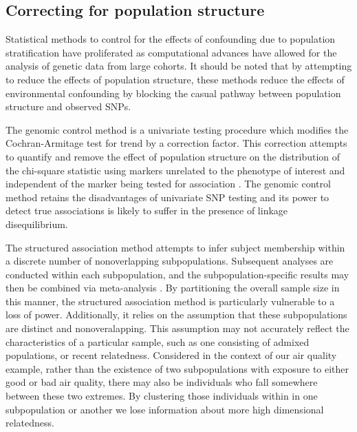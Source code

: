 


\subsection{Correcting for population structure}

Statistical methods to control for the effects of confounding due to population stratification have proliferated as computational advances have allowed for the analysis of genetic data from large cohorts. It should be noted that by attempting to reduce the effects of population structure, these methods reduce the effects of environmental confounding by blocking the casual pathway between population structure and observed SNPs.

The genomic control method is a univariate testing procedure which modifies the Cochran-Armitage test for trend by a correction factor. This correction attempts to quantify and remove the effect of population structure on the distribution of the chi-square statistic using markers unrelated to the phenotype of interest and independent of the marker being tested for association \cite{devlin1999genomic, bacanu2000power, wang2009testing}. The genomic control method retains the disadvantages of univariate SNP testing and its power to detect true associations is likely to suffer in the presence of linkage disequilibrium. 

The structured association method attempts to infer subject membership within a discrete number of nonoverlapping subpopulations. Subsequent analyses are conducted within each subpopulation, and the subpopulation-specific results may then be combined via meta-analysis \cite{pritchard1999use, pritchard2000association}. By partitioning the overall sample size in this manner, the structured association method is particularly vulnerable to a loss of power. Additionally, it relies on the assumption that these subpopulations are distinct and nonoveralapping. This assumption may not accurately reflect the characteristics of a particular sample, such as one consisting of admixed populations, or recent relatedness. Considered in the context of our air quality example, rather than the existence of two subpopulations with exposure to either good or bad air quality, there may also be individuals who fall somewhere between these two extremes. By clustering those individuals within in one subpopulation or another we lose information about more high dimensional relatedness.

